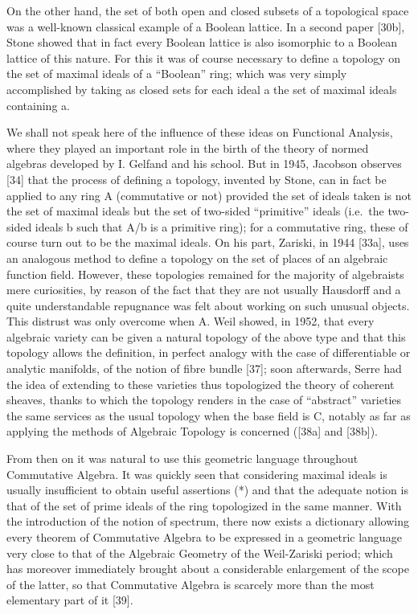 On the other hand, the set of both open and closed subsets of a topological space was a well-known classical example of a Boolean lattice. In a second paper {[}30b{]}, Stone showed that in fact every Boolean lattice is also isomorphic to a Boolean lattice of this nature. For this it was of course necessary to define a topology on the set of maximal ideals of a ``Boolean'' ring; which was very simply accomplished by taking as closed sets for each ideal a the set of maximal ideals containing a.

We shall not speak here of the influence of these ideas on Functional Analysis, where they played an important role in the birth of the theory of normed algebras developed by I. Gelfand and his school. But in 1945, Jacobson observes {[}34{]} that the process of defining a topology, invented by Stone, can in fact be applied to any ring A (commutative or not) provided the set of ideals taken is not the set of maximal ideals but the set of two-sided ``primitive'' ideals (i.e.~the two-sided ideals b such that A/b is a primitive ring); for a commutative ring, these of course turn out to be the maximal ideals. On his part, Zariski, in 1944 {[}33a{]}, uses an analogous method to define a topology on the set of places of an algebraic function field. However, these topologies remained for the majority of algebraists mere curiosities, by reason of the fact that they are not usually Hausdorff and a quite understandable repugnance was felt about working on such unusual objects. This distrust was only overcome when A. Weil showed, in 1952, that every algebraic variety can be given a natural topology of the above type and that this topology allows the definition, in perfect analogy with the case of differentiable or analytic manifolds, of the notion of fibre bundle {[}37{]}; soon afterwards, Serre had the idea of extending to these varieties thus topologized the theory of coherent sheaves, thanks to which the topology renders in the case of ``abstract'' varieties the same services as the usual topology when the base field is C, notably as far as applying the methods of Algebraic Topology is concerned ({[}38a{]} and {[}38b{]}).

From then on it was natural to use this geometric language throughout Commutative Algebra. It was quickly seen that considering maximal ideals is usually insufficient to obtain useful assertions (*) and that the adequate notion is that of the set of prime ideals of the ring topologized in the same manner. With the introduction of the notion of spectrum, there now exists a dictionary allowing every theorem of Commutative Algebra to be expressed in a geometric language very close to that of the Algebraic Geometry of the Weil-Zariski period; which has moreover immediately brought about a considerable enlargement of the scope of the latter, so that Commutative Algebra is scarcely more than the most elementary part of it {[}39{]}.
